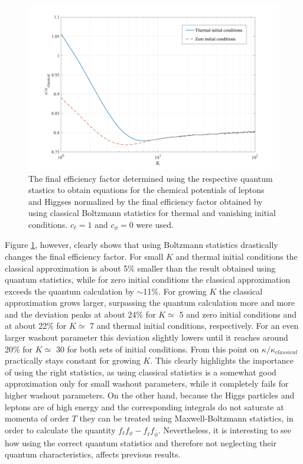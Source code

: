\begin{figure}[H]
	\centering
	\includegraphics[width=\linewidth]{Images/quantum}
	\caption{The final efficiency factor determined using the respective quantum stastics to obtain equations for the chemical potentials of leptons and Higgses normalized by the final efficiency factor obtained by using classical Boltzmann statistics for thermal and vanishing initial conditions. $c_\ell=1$ and $c_\phi=0$ were used.}
	\label{fig:quantum}
\end{figure} \noindent
Figure \ref{fig:quantum}, however, clearly shows that using Boltzmann statistics drastically changes the final efficiency factor. For small $K$ and thermal initial conditions the classical approximation is about 5\% smaller than the result obtained using quantum statistics, while for zero initial conditions the classical approximation exceeds the quantum calculation by $\sim$11\%. For growing $K$ the classical approximation grows larger, surpassing the quantum calculation more and more and the deviation peaks at about 24\% for $K\simeq$ 5 and zero initial conditions and at about 22\% for $K\simeq$ 7 and thermal initial conditions, respectively. For an even larger washout parameter this deviation slightly lowers until it reaches around 20\% for $K\simeq$ 30 for both sets of initial conditions. From this point on $\kappa/\kappa_{classical}$ practically stays constant for growing $K$.
This clearly highlights the importance of using the right statistics, as using classical statistics is a somewhat good approximation only for small washout parameters, while it completely fails for higher washout parameters.\newline \indent
On the other hand, because the Higgs particles and leptons are of high energy and the corresponding integrals do not saturate at momenta of order $T$ they can be treated using Maxwell-Boltzmann statistics, in order to calculate the quantity $f_\ell f_\phi-f_{\bar{\ell}}f_{\bar{\phi}}$. Nevertheless, it is interesting to see how using the correct quantum statistics and therefore not neglecting their quantum characteristics, affects previous results.
